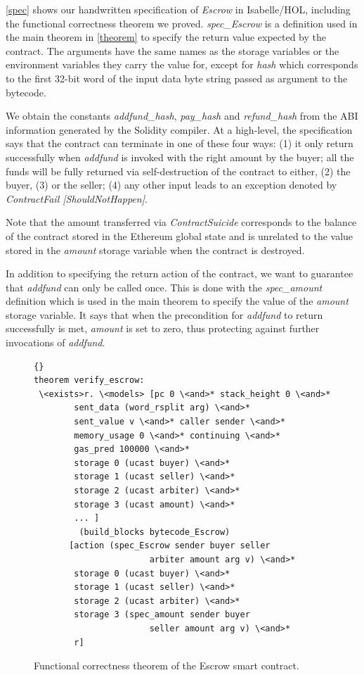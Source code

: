 \documentclass[sigplan,10pt]{acmart}\settopmatter{printfolios=true,printccs=false,printacmref=false}
\begin{document}
\autoref{spec} shows our handwritten specification of \textit{Escrow} in Isabelle/HOL,
including the functional correctness theorem we proved.
\textit{spec\_Escrow} is a definition used in the main theorem in \autoref{theorem} to specify
the return value expected by the contract.
The arguments have the same names as the storage variables or the environment
variables they carry the value for, except for \textit{hash} which corresponds
to the first 32-bit word of the input data byte string passed as argument
to the bytecode.

We obtain the constants \textit{addfund\_hash}, \textit{pay\_hash} and
\textit{refund\_hash} from the ABI information generated by the Solidity compiler.
At a high-level, the specification says that the contract can
terminate in one of these four ways:
(1) it only return successfully when \textit{addfund}
is invoked with the right amount by the buyer;
all the funds will be fully returned via self-destruction of
the contract to either, (2) the buyer,
(3) or the seller;
(4) any other input leads to an exception denoted by \textit{ContractFail [ShouldNotHappen]}.

Note that the amount transferred via \textit{ContractSuicide} corresponds
to the balance of the contract stored in the Ethereum global state and
is unrelated to the value stored in the \textit{amount} storage variable
when the contract is destroyed.

In addition to specifying the return action of the contract, we want
to guarantee that \textit{addfund} can only be called once.
This is done with the \textit{spec\_amount} definition which
is used in the main theorem to specify the value of the
\textit{amount} storage variable.
It says that when the precondition for \textit{addfund} to
return successfully is met, \textit{amount} is set to zero,
thus protecting against further invocations of \textit{addfund}.

\begin{figure}[h]
\begin{lstlisting}[language=Isar]{}
theorem verify_escrow:
 \<exists>r. \<models> [pc 0 \<and>* stack_height 0 \<and>*
        sent_data (word_rsplit arg) \<and>*
        sent_value v \<and>* caller sender \<and>*
        memory_usage 0 \<and>* continuing \<and>*
        gas_pred 100000 \<and>* 
        storage 0 (ucast buyer) \<and>*
        storage 1 (ucast seller) \<and>*
        storage 2 (ucast arbiter) \<and>*
        storage 3 (ucast amount) \<and>*
        ... ]
         (build_blocks bytecode_Escrow)
       [action (spec_Escrow sender buyer seller
                       arbiter amount arg v) \<and>*
        storage 0 (ucast buyer) \<and>*
        storage 1 (ucast seller) \<and>*
        storage 2 (ucast arbiter) \<and>*
        storage 3 (spec_amount sender buyer
                       seller amount arg v) \<and>*
        r]
\end{lstlisting}
\caption{Functional correctness theorem of the Escrow smart contract.}
\label{theorem}
\end{figure}
\end{document}
